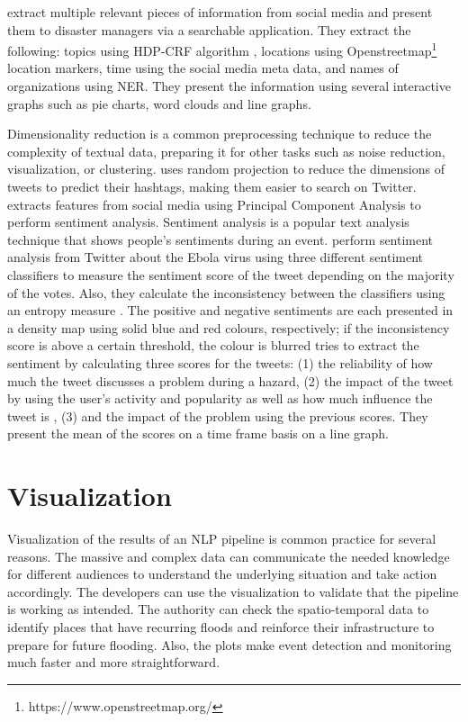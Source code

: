  extract multiple relevant pieces of information from
social media and present them to disaster managers via a searchable application. They extract the
following: topics using HDP-CRF algorithm \cite{tehHierarchicalBayesianNonparametric2010},
locations using Openstreetmap\footnote{https://www.openstreetmap.org/} location markers, time using
the social media meta data, and names of organizations using \ac{NER}. They present
the information using several interactive graphs such as pie charts, word clouds and line graphs.

Dimensionality reduction is a common preprocessing technique to reduce the complexity of textual
data, preparing it for other tasks such as noise reduction, visualization, or clustering.
 uses random projection to reduce the
dimensions of tweets to predict their hashtags, making them easier to search on Twitter.
 extracts features from social media using Principal
Component Analysis to perform sentiment analysis. Sentiment analysis is a popular text analysis
technique that shows people's sentiments during an event. 
perform sentiment analysis from Twitter about the Ebola virus using three different sentiment
classifiers to measure the sentiment score of the tweet depending on the majority of the votes.
Also, they calculate the inconsistency between the classifiers using an entropy measure
\cite{argamon-engelsonCommitteeBasedSampleSelection1999}. The positive and negative sentiments are
each presented in a density map using solid blue and red colours, respectively; if the inconsistency
score is above a certain threshold, the colour is blurred
 tries to extract the sentiment by calculating
three scores for the tweets: (1) the reliability of how much the tweet discusses a problem during a
hazard, (2) the impact of the tweet by using the user's activity and popularity as well as how much
influence the tweet is \cite{palIdentifyingTopicalAuthorities2011}, (3) and the impact of the
problem using the previous scores. They present the mean of the scores on a time frame basis on a
line graph.

\section{Visualization}
Visualization of the results of an \ac{NLP} pipeline is common practice for several reasons. The
massive and complex data can communicate the needed knowledge for different audiences to understand
the underlying situation and take action accordingly. The developers can use the visualization to
validate that the pipeline is working as intended. The authority can check the spatio-temporal data
to identify places that have recurring floods and reinforce their infrastructure to prepare for
future flooding. Also, the plots make event detection and monitoring much faster and more
straightforward.

